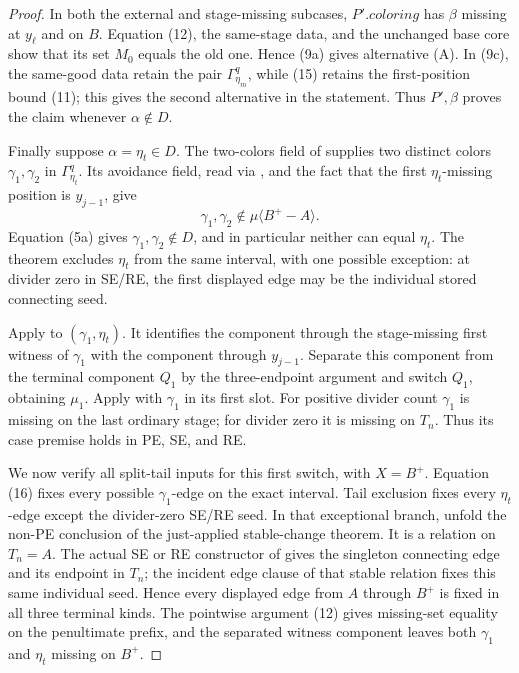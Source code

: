 \begin{proof}
In both the external and stage-missing subcases, \(P'.\mathit{coloring}\)
has \(\beta\) missing at \(y_\ell\) and on \(B\).  Equation (12), the
same-stage data, and the unchanged base core show that its set \(M_0\)
equals the old one.  Hence (9a) gives alternative (A).  In (9c), the
same-good data retain the pair \(\Gamma^q_{\eta_m}\), while (15) retains
the first-position bound (11); this gives the second alternative in the
statement.  Thus \(P',\beta\) proves the claim whenever
\(\alpha\notin D\).

Finally suppose \(\alpha=\eta_t\in D\).  The two-colors field of
 supplies two distinct colors
\(\gamma_1,\gamma_2\) in \(\Gamma^q_{\eta_t}\).  Its avoidance field,
read via , and the fact that the first
\(\eta_t\)-missing position is \(y_{j-1}\), give
\[
 \gamma_1,\gamma_2\notin\mu\langle B^+-A\rangle.             \tag{16}
\]
Equation (5a) gives \(\gamma_1,\gamma_2\notin D\), and in particular
neither can equal \(\eta_t\).
The theorem  excludes
\(\eta_t\) from the same interval, with one possible exception: at
divider zero in SE/RE, the first displayed edge may be the individual
stored connecting seed.

Apply  to \((\gamma_1,\eta_t)\).  It identifies the
component through the stage-missing first witness of \(\gamma_1\) with
the component through \(y_{j-1}\).  Separate this component from the
terminal component \(Q_1\) by the three-endpoint argument and switch
\(Q_1\), obtaining \(\mu_1\).  Apply
 with \(\gamma_1\) in its first slot.
For positive divider count \(\gamma_1\) is missing on the last ordinary
stage; for divider zero it is missing on \(T_n\).  Thus its case premise
holds in PE, SE, and RE.

We now verify all split-tail inputs for this first switch, with
\(X=B^+\).  Equation (16) fixes every possible \(\gamma_1\)-edge on the
exact interval.  Tail exclusion fixes every \(\eta_t\)-edge except the
divider-zero SE/RE seed.  In that exceptional branch, unfold the
non-PE  conclusion of the just-applied
stable-change theorem.  It is a  relation on
\(T_n=A\).
The actual SE or RE constructor of  gives
the singleton connecting edge and its endpoint in \(T_n\); the incident
edge clause of that stable relation fixes this same individual seed.
Hence every displayed edge from \(A\) through \(B^+\) is fixed in all
three terminal kinds.  The pointwise argument (12) gives missing-set
equality on the penultimate prefix, and the separated witness component
leaves both \(\gamma_1\) and \(\eta_t\) missing on \(B^+\).


\end{proof}
